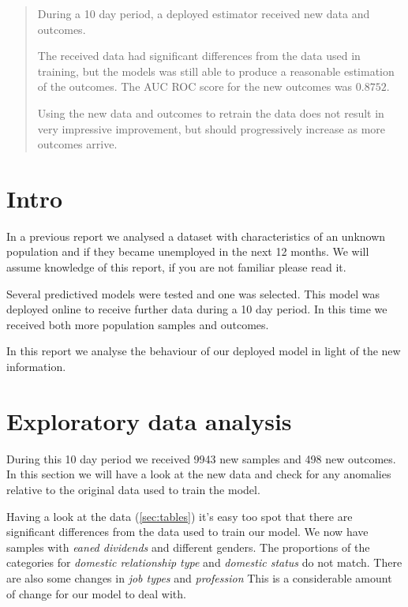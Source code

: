 \documentclass[a4paper]{article}
\begin{document}
    \maketitle

    \begin{abstract}
        During a 10 day period, a deployed estimator received new data and
        outcomes.

        The received data had significant differences from the data used in
        training, but the models was still able to produce a reasonable
        estimation of the outcomes.
        The AUC ROC score for the new outcomes was \(0.8752\).

        Using the new data and outcomes to retrain the data does not result
        in  very impressive improvement, but should progressively increase
        as more outcomes arrive.
    \end{abstract}


    \section{Intro}
    \label{sec:intro}
    In a previous report we analysed a dataset with characteristics of an
    unknown population and if they became unemployed in the next 12 months.
    We will assume knowledge of this report, if you are not familiar please
    read it.

    Several predictived models were tested and one was selected.
    This model was deployed online to receive further data during a 10 day
    period.
    In this time we received both more population samples and outcomes.

    In this report we analyse the behaviour of our deployed model in light
    of the new information.


    \section{Exploratory data analysis}
    \label{sec:data}

    During this 10 day period we received 9943 new samples and 498 new
    outcomes.
    In this section we will have a look at the new data and check for any
    anomalies relative to the original data used to train the model.

    Having a look at the data (\vref{sec:tables}) it's easy too spot that
    there are significant differences from the data used to train our model.
    We now have samples with \emph{eaned dividends} and different genders.
    The proportions of the categories for \emph{domestic relationship type}
    and \emph{domestic status} do not match.
    There are also some changes in \emph{job types} and \emph{profession}
    This is a considerable amount of change for our model to deal with.
\end{document}
